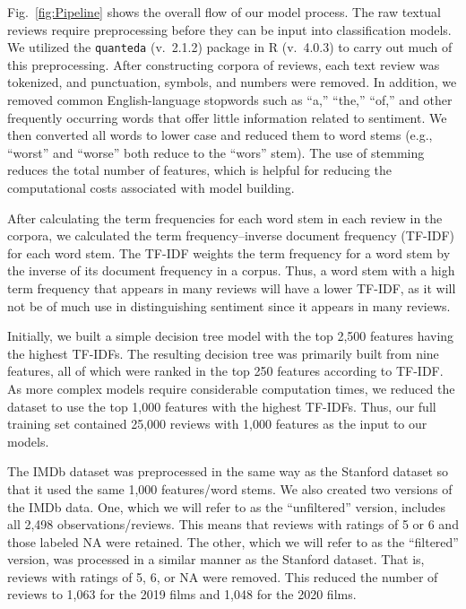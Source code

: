 \documentclass[conference]{IEEEtran}
\begin{document}

Fig.~\ref{fig:Pipeline} shows the overall flow of our model process. The raw textual reviews require preprocessing before they can be input into classification models. We utilized the \verb|quanteda| (v.~2.1.2) package in R (v.~4.0.3) to carry out much of this preprocessing. After constructing corpora of reviews, each text review was tokenized, and punctuation, symbols, and numbers were removed. In addition, we removed common English-language stopwords such as ``a,'' ``the,'' ``of,'' and other frequently occurring words that offer little information related to sentiment. We then converted all words to lower case and reduced them to word stems (e.g., ``worst'' and ``worse'' both reduce to the ``wors'' stem). The use of stemming reduces the total number of features, which is helpful for reducing the computational costs associated with model building.

After calculating the term frequencies for each word stem in each review in the corpora, we calculated the term frequency--inverse document frequency (TF-IDF) for each word stem. The TF-IDF weights the term frequency for a word stem by the inverse of its document frequency in a corpus. Thus, a word stem with a high term frequency that appears in many reviews will have a lower TF-IDF, as it will not be of much use in distinguishing sentiment since it appears in many reviews.

Initially, we built a simple decision tree model with the top 2,500 features having the highest TF-IDFs. The resulting decision tree was primarily built from nine features, all of which were ranked in the top 250 features according to TF-IDF. As more complex models require considerable computation times, we reduced the dataset to use the top 1,000 features with the highest TF-IDFs. Thus, our full training set contained 25,000 reviews with 1,000 features as the input to our models.

The IMDb dataset was preprocessed in the same way as the Stanford dataset so that it used the same 1,000 features/word stems. We also created two versions of the IMDb data. One, which we will refer to as the ``unfiltered'' version, includes all 2,498 observations/reviews. This means that reviews with ratings of 5 or 6 and those labeled NA were retained. The other, which we will refer to as the ``filtered'' version, was processed in a similar manner as the Stanford dataset. That is, reviews with ratings of 5, 6, or NA were removed. This reduced the number of reviews to 1,063 for the 2019 films and 1,048 for the 2020 films.
\end{document}

